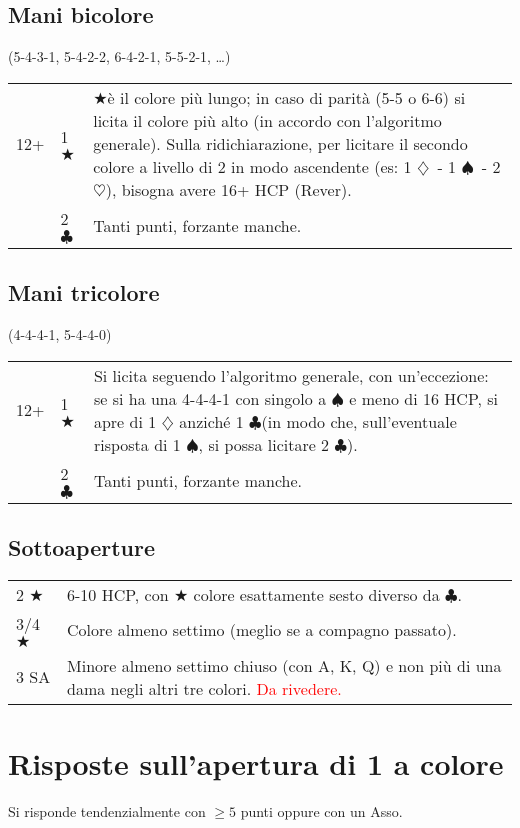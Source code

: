 \documentclass[a4paper,10pt]{article}
\renewcommand{\c}{$\clubsuit$\xspace}
\renewcommand{\d}{$\diamondsuit$\xspace}
\newcommand{\h}{$\heartsuit$\xspace}
\newcommand{\s}{$\spadesuit$\xspace}
\renewcommand{\j}{$\bigstar$\xspace}
\newcommand{\sa}{SA\xspace}
\newcommand{\smallspace}{\vskip0.3cm}
\newcommand{\note}[1]{\textcolor{red}{#1}}
\newenvironment{twocol}
  {\smallspace\noindent\begin{tabular}{l p{0.8\textwidth}}}
  {\end{tabular}\smallspace}
\newenvironment{threecol}
  {\smallspace\noindent\begin{tabular}{l l p{0.7\textwidth}}}
  {\end{tabular}\smallspace}
\begin{document}
\subsection{Mani bicolore}
(5-4-3-1, 5-4-2-2, 6-4-2-1, 5-5-2-1, \dots)

\begin{threecol}
 12+ & 1 \j & \j \`e il colore pi\`u lungo; in caso di parit\`a (5-5 o 6-6) si licita il colore pi\`u alto (in accordo con l'algoritmo generale). Sulla ridichiarazione, per licitare il secondo colore a livello di 2 in modo ascendente (es: 1 \d\ - 1 \s\ - 2 \h), bisogna avere 16+ HCP (Rever).\\
 & 2 \c & Tanti punti, forzante manche.
\end{threecol}


\subsection{Mani tricolore}
(4-4-4-1, 5-4-4-0)

\begin{threecol}
 12+ & 1 \j & Si licita seguendo l'algoritmo generale, con un'eccezione: se si ha una 4-4-4-1 con singolo a \s e meno di 16 HCP, si apre di 1 \d anzich\'e 1 \c (in modo che, sull'eventuale risposta di 1 \s, si possa licitare 2 \c).\\
 & 2 \c & Tanti punti, forzante manche.
\end{threecol}


\subsection{Sottoaperture}

\begin{twocol}
 2 \j & 6-10 HCP, con \j colore esattamente sesto diverso da \c.\\
 3/4 \j & Colore almeno settimo (meglio se a compagno passato).\\
 3 \sa & Minore almeno settimo chiuso (con A, K, Q) e non pi\`u di una dama negli altri tre colori. \note{Da rivedere.}
\end{twocol}



\pagebreak

\section{Risposte sull'apertura di 1 a colore}

Si risponde tendenzialmente con $\geq 5$ punti oppure con un Asso.
\end{document}
